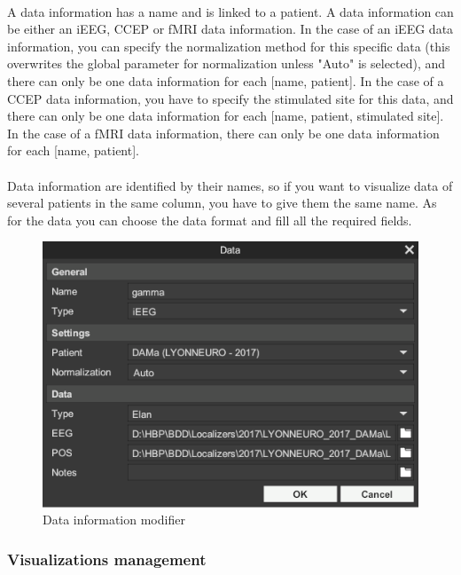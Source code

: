 \documentclass[a4paper]{article}
\begin{document}
\paragraph{} A data information has a name and is linked to a patient. A data information can be either an iEEG, CCEP or fMRI data information. In the case of an iEEG data information, you can specify the normalization method for this specific data (this overwrites the global parameter for normalization unless "Auto" is selected), and there can only be one data information for each [name, patient]. In the case of a CCEP data information, you have to specify the stimulated site for this data, and there can only be one data information for each [name, patient, stimulated site]. In the case of a fMRI data information, there can only be one data information for each [name, patient].
\paragraph{} Data information are identified by their names, so if you want to visualize data of several patients in the same column, you have to give them the same name. As for the data you can choose the data format and fill all the required fields.
\begin{figure}[H]
\begin{center}
\includegraphics[scale=0.5]{DataInfoModifier.png}
\end{center}
\caption{\label{dataInfoModifierUI}Data information modifier}
\end{figure}
\subsubsection{Visualizations management}
\end{document}
